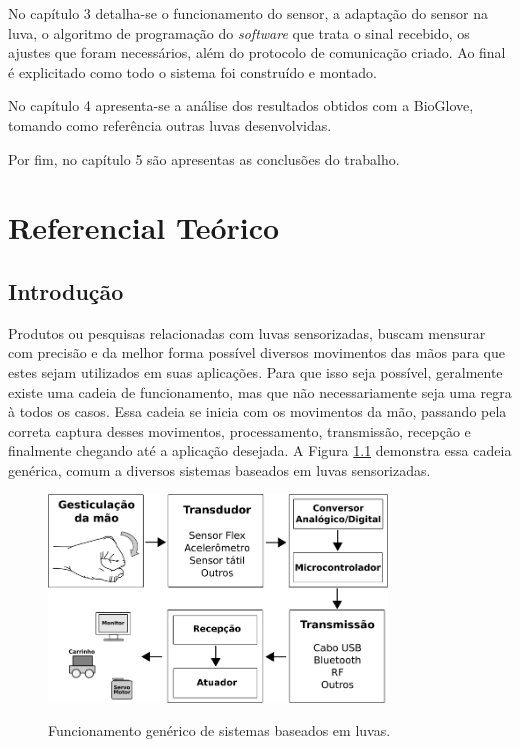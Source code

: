 \documentclass[
	12pt,				%
	openright,			%
	oneside,			%
	a4paper,			%
	english,			%
	brazil				%
	]{abntex2}
\begin{document}
		No capítulo 3 detalha-se o funcionamento do sensor, a adaptação do sensor na luva, o algoritmo de programação do \textit{software} que trata o sinal recebido, os ajustes que foram necessários, além do protocolo de comunicação criado. Ao final é explicitado como todo o sistema foi construído e montado.

		No capítulo 4 apresenta-se a análise dos resultados obtidos com a BioGlove, tomando como referência outras luvas desenvolvidas.

		Por fim, no capítulo 5 são apresentas as conclusões do trabalho.
		





	
	\chapter{Referencial Teórico}

		\section{Introdução}



		Produtos ou pesquisas relacionadas com luvas sensorizadas, buscam mensurar com precisão e da melhor forma possível diversos movimentos das mãos para que estes sejam utilizados em suas aplicações. Para que isso seja possível, geralmente existe uma cadeia de funcionamento, mas que não necessariamente seja uma regra à todos os casos. Essa cadeia se inicia com os movimentos da mão, passando pela correta captura desses movimentos, processamento, transmissão, recepção e finalmente chegando até a aplicação desejada. A Figura \ref{Fig:flowchart1} demonstra essa cadeia genérica, comum a diversos sistemas baseados em luvas sensorizadas.

		\begin{figure}[h!]
			\centering
			\caption{Funcionamento genérico de sistemas baseados em luvas.}
  		\includegraphics[width=9cm]{./figures/flowchart1.png}
  		\label{Fig:flowchart1}
		\end{figure}
\end{document}
